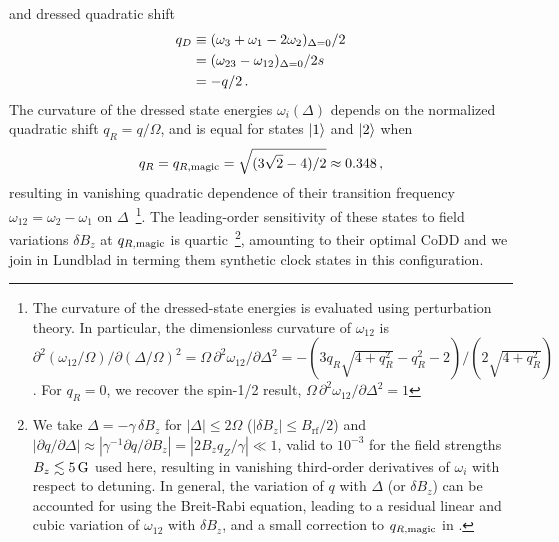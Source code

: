 \documentclass[aps,prl,reprint,superscriptaddress,floatfix]{revtex4-1}
\begin{document}
and dressed quadratic shift
\begin{align}
\label{eq:dressed_quadratic}
    q_D &\equiv (\omega_3 + \omega_1 -2\omega_2)_{\Delta=0}/2 \notag\\
        &= (\omega_{23}-\omega_{12})_{\Delta=0}/2 \notag s\\ 
        &= -q/2 \, .
 \end{align}
The curvature of the dressed state energies $\omega_i(\Delta)$ depends on the normalized quadratic shift $q_R = q/\Omega$, and is equal for states $\vert 1 \rangle $ and $\vert 2 \rangle $ when 
\begin{align}
\label{eq:qRmagic}
    q_R = q_{R,\text{magic}} = \sqrt{(3\sqrt{2} - 4)/2} \approx 0.348 \, ,
\end{align}
resulting in vanishing quadratic dependence of their transition frequency $\omega_{12}=\omega_2 - \omega_1$ on $\Delta$~\footnote{
    The curvature of the dressed-state energies is evaluated using perturbation theory. In particular, the dimensionless curvature of $\omega_{12}$ is $\partial^2(\omega_{12}/\Omega)/\partial(\Delta/\Omega)^2 = \Omega \, \partial^2\omega_{12}/\partial \Delta^2 = -(3 q_R \sqrt{4 + q_R^2} - q_R^2 - 2)/(2 \sqrt{4 + q_R^2})$.
    For $q_R = 0$, we recover the spin-1/2 result, $\Omega\, \partial^2\omega_{12}/\partial \Delta^2 = 1$}.
The leading-order sensitivity of these states to field variations $\delta B_z$ at $q_{R,\text{magic}}$ is quartic~\footnote{
    We take $\Delta = -\gamma \, \delta B_z$ for $|\Delta | \leq 2\Omega$ ($| \delta B_z | \leq B_{\text{rf}}/2$) and $| \partial q / \partial \Delta | \approx | \gamma^{-1} \partial q / \partial B_z | = |2 B_z q_Z / \gamma| \ll 1$, valid to $10^{-3}$ for the field strengths $B_z \lesssim \unit[5]{G}$ used here, resulting in vanishing third-order derivatives of $\omega_i$ with respect to detuning. 
    In general, the variation of $q$ with $\Delta$ (or $\delta B_z$) can be accounted for using the Breit-Rabi equation, leading to a residual linear and cubic variation of $\omega_{12}$ with $\delta B_z$, and a small correction to $q_{R,\text{magic}}$ in .},
amounting to their optimal CoDD and we join in Lundblad \etal in terming them synthetic clock states in this configuration.
\end{document}
